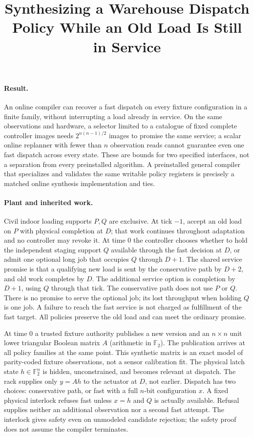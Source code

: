 \documentclass[11pt]{article}
\title{Synthesizing a Warehouse Dispatch Policy While an Old Load Is Still in Service}
\date{}
\begin{document}
\maketitle

\paragraph{Result.}
An online compiler can recover a fast dispatch on every fixture configuration in a finite family, without interrupting a load already in service. On the same observations and hardware, a selector limited to a catalogue of fixed complete controller images needs $2^{n(n-1)/2}$ images to promise the same service; a scalar online replanner with fewer than $n$ observation reads cannot guarantee even one fast dispatch across every state. These are bounds for two specified interfaces, not a separation from every preinstalled algorithm. A preinstalled general compiler that specializes and validates the same writable policy registers is precisely a matched online synthesis implementation and ties.

\paragraph{Plant and inherited work.}
Civil indoor loading supports $P,Q$ are exclusive. At tick $-1$, accept an old load on $P$ with physical completion at $D$; that work continues throughout adaptation and no controller may revoke it. At time $0$ the controller chooses whether to hold the independent staging support $Q$ available through the fast decision at $D$, or admit one optional long job that occupies $Q$ through $D+1$. The shared service promise is that a qualifying new load is sent by the conservative path by $D+2$, and old work completes by $D$. The additional service option is completion by $D+1$, using $Q$ through that tick. The conservative path does not use $P$ or $Q$. There is no promise to serve the optional job; its lost throughput when holding $Q$ is one job. A failure to reach the fast service is not charged as fulfillment of the fast target. All policies preserve the old load and can meet the ordinary promise.

At time $0$ a trusted fixture authority publishes a new version and an $n\times n$ unit lower triangular Boolean matrix $A$ (arithmetic in $\mathbb F_2$). The publication arrives at all policy families at the same point. This synthetic matrix is an exact model of parity-coded fixture observations, not a sensor calibration fit. The physical latch state $h\in\mathbb F_2^n$ is hidden, unconstrained, and becomes relevant at dispatch. The rack supplies only $y=Ah$ to the actuator at $D$, not earlier. Dispatch has two choices: conservative path, or fast with a full $n$-bit configuration $x$. A fixed physical interlock refuses fast unless $x=h$ and $Q$ is actually available. Refusal supplies neither an additional observation nor a second fast attempt. The interlock gives safety even on unmodeled candidate rejection; the safety proof does not assume the compiler terminates.
\end{document}
